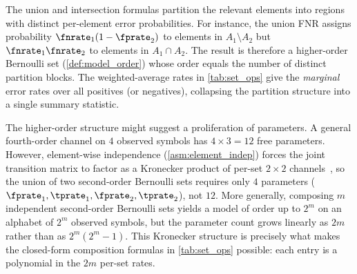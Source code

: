 \begin{remark}
\label{rem:composed_order}
The union and intersection formulas partition the relevant elements into regions with distinct per-element error probabilities.
For instance, the union FNR assigns probability $\fnrate_1(1-\fprate_2)$ to elements in $A_1 \setminus A_2$ but $\fnrate_1 \fnrate_2$ to elements in $A_1 \cap A_2$.
The result is therefore a higher-order Bernoulli set (\cref{def:model_order}) whose order equals the number of distinct partition blocks.
The weighted-average rates in \cref{tab:set_ops} give the \emph{marginal} error rates over all positives (or negatives), collapsing the partition structure into a single summary statistic.
\end{remark}

\begin{remark}
\label{rem:parametric_parsimony}
The higher-order structure might suggest a proliferation of parameters.
A general fourth-order channel on $4$ observed symbols has $4 \times 3 = 12$ free parameters.
However, element-wise independence (\cref{asm:element_indep}) forces the joint transition matrix to factor as a Kronecker product of per-set $2 \times 2$ channels~\cite{coverThomas}, so the union of two second-order Bernoulli sets requires only $4$ parameters ($\fprate_1, \tprate_1, \fprate_2, \tprate_2$), not $12$.
More generally, composing $m$ independent second-order Bernoulli sets yields a model of order up to $2^m$ on an alphabet of $2^m$ observed symbols, but the parameter count grows linearly as $2m$ rather than as $2^m(2^m - 1)$.
This Kronecker structure is precisely what makes the closed-form composition formulas in \cref{tab:set_ops} possible: each entry is a polynomial in the $2m$ per-set rates.
\end{remark}

